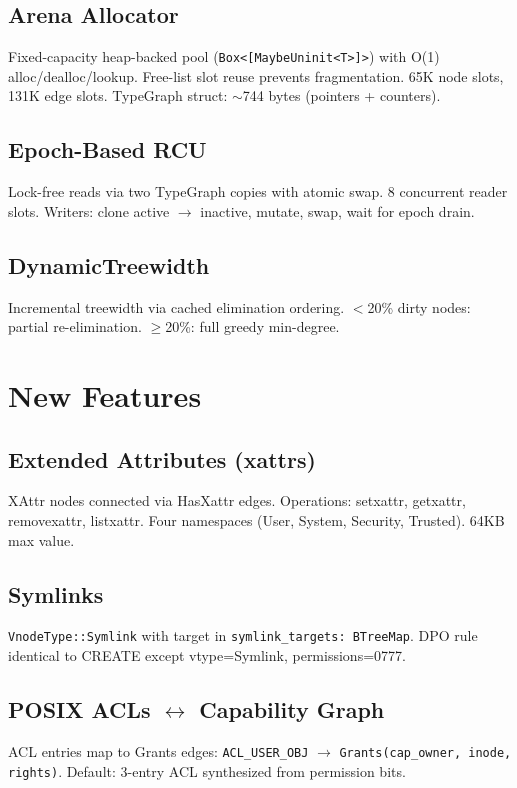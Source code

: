 \documentclass[11pt,a4paper,twoside]{report}
\theoremstyle{definition}
\begin{document}
\section{Arena Allocator}
Fixed-capacity heap-backed pool (\texttt{Box<[MaybeUninit<T>]>}) with O(1) alloc/dealloc/lookup.
Free-list slot reuse prevents fragmentation.  65K node slots, 131K edge slots.
TypeGraph struct: $\sim$744 bytes (pointers + counters).

\section{Epoch-Based RCU}
Lock-free reads via two TypeGraph copies with atomic swap.  8 concurrent reader slots.
Writers: clone active $\to$ inactive, mutate, swap, wait for epoch drain.

\section{DynamicTreewidth}
Incremental treewidth via cached elimination ordering.
$<$20\% dirty nodes: partial re-elimination.  $\geq$20\%: full greedy min-degree.

\chapter{New Features}

\section{Extended Attributes (xattrs)}
XAttr nodes connected via HasXattr edges.  Operations: setxattr, getxattr, removexattr, listxattr.
Four namespaces (User, System, Security, Trusted).  64KB max value.

\section{Symlinks}
\texttt{VnodeType::Symlink} with target in \texttt{symlink\_targets: BTreeMap}.
DPO rule identical to CREATE except vtype=Symlink, permissions=0777.

\section{POSIX ACLs $\leftrightarrow$ Capability Graph}
ACL entries map to Grants edges: \texttt{ACL\_USER\_OBJ} $\to$ \texttt{Grants(cap\_owner, inode, rights)}.
Default: 3-entry ACL synthesized from permission bits.
\end{document}
